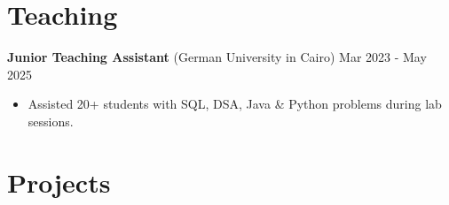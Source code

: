 \documentclass[a4paper,11pt]{article}
\begin{document}
\section{\textbf{Teaching}}
\textbf{Junior Teaching Assistant} (German University in Cairo)  \hfill {Mar 2023 - May 2025}
    \begin{itemize}
        \item Assisted 20+ students with SQL, DSA, Java \& Python problems during lab sessions.
    \end{itemize}
\section{\textbf{Projects}}
\end{document}
